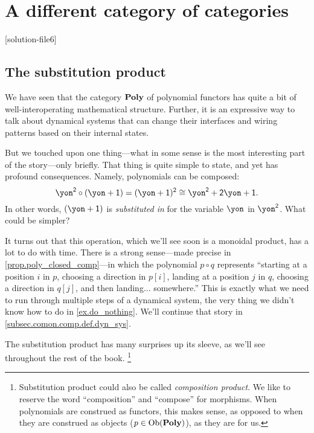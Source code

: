 \documentclass[Book-Poly]{subfiles}
\begin{document}
%

\setcounter{chapter}{5}%

\part{A different category of categories}\label{part.comon}

[solution-file6]

\chapter{The substitution product}\label{ch.comon.comp}


We have seen that the category $\mathbf{Poly}$ of polynomial functors has quite a bit of well-interoperating mathematical structure. Further, it is an expressive way to talk about dynamical systems that can change their interfaces and wiring patterns based on their internal states.

But we touched upon one thing---what in some sense is the most interesting part of the story---only briefly. That thing is quite simple to state, and yet has profound consequences. Namely, polynomials can be composed:
\[
\yon^\2\circ(\yon+\1)=(\yon+\1)^\2\iso\yon^\2+\2\yon+\1.
\]
In other words, $(\yon+\1)$ is \emph{substituted in} for the variable $\yon$ in $\yon^\2$. What could be simpler? 

It turns out that this operation, which we'll see soon is a monoidal product, has a lot to do with time.
There is a strong sense---made precise in \cref{prop.poly_closed_comp}---in which the polynomial $p\circ q$ represents ``starting at a position $i$ in $p$, choosing a direction in $p[i]$, landing at a position $j$ in $q$, choosing a direction in $q[j]$, and then landing... somewhere.''
This is exactly what we need to run through multiple steps of a dynamical system, the very thing we didn't know how to do in \cref{ex.do_nothing}.
We'll continue that story in \cref{subsec.comon.comp.def.dyn_sys}.


The substitution product has many surprises up its sleeve, as we'll see throughout the rest of the book.%
\footnote{Substitution product could also be called \emph{composition product}. We like to reserve the word ``composition'' and ``compose'' for morphisms. When polynomials are construed as functors, this makes sense, as opposed to when they are construed as objects ($p\in\operatorname{Ob}(\mathbf{Poly})$), as they are for us.}
\end{document}
